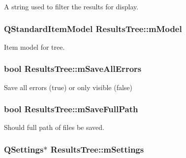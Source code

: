 A string used to filter the results for display. 

\hypertarget{class_results_tree_a8889b30c7b1a91bc7e8190fca9f7e6bd}{
\subsubsection[{m\-Model}]{\setlength{\rightskip}{0pt plus 5cm}Q\-Standard\-Item\-Model Results\-Tree\-::m\-Model\hspace{0.3cm}{\ttfamily [protected]}}}\label{class_results_tree_a8889b30c7b1a91bc7e8190fca9f7e6bd}


Item model for tree. 

\hypertarget{class_results_tree_abdcc47d8713e599e1a9a48fcab53a0ce}{
\subsubsection[{m\-Save\-All\-Errors}]{\setlength{\rightskip}{0pt plus 5cm}bool Results\-Tree\-::m\-Save\-All\-Errors\hspace{0.3cm}{\ttfamily [protected]}}}\label{class_results_tree_abdcc47d8713e599e1a9a48fcab53a0ce}


Save all errors (true) or only visible (false) 

\hypertarget{class_results_tree_a0d2d94d0193a1749d7d8028ef8325c6c}{
\subsubsection[{m\-Save\-Full\-Path}]{\setlength{\rightskip}{0pt plus 5cm}bool Results\-Tree\-::m\-Save\-Full\-Path\hspace{0.3cm}{\ttfamily [protected]}}}\label{class_results_tree_a0d2d94d0193a1749d7d8028ef8325c6c}


Should full path of files be saved. 

\hypertarget{class_results_tree_a7dba9cd0f96e3fc49fb13b7256319ebc}{
\subsubsection[{m\-Settings}]{\setlength{\rightskip}{0pt plus 5cm}Q\-Settings$\ast$ Results\-Tree\-::m\-Settings\hspace{0.3cm}{\ttfamily [protected]}}}\label{class_results_tree_a7dba9cd0f96e3fc49fb13b7256319ebc}


